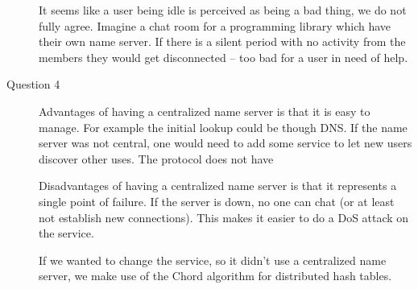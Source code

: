 \begin{description}
        It seems like a user being idle is perceived as being a bad thing, we do not fully agree. Imagine a chat room for a programming library which have their own name server. If there is a silent period with no activity from the members they would get disconnected -- too bad for a user in need of help.


    \item[Question 4]
        Advantages of having a centralized name server is that it is easy to manage. For example the initial lookup could be though DNS. If the name server was not central, one would need to add some service to let new users discover other uses.
        The protocol does not have

        Disadvantages of having a centralized name server is that it represents a single point of failure. If the server is down, no one can chat (or at least not establish new connections). This makes it easier to do a DoS attack on the service.

        If we wanted to change the service, so it didn't use a centralized name server, we make use of the Chord algorithm for distributed hash tables.


\end{description}
